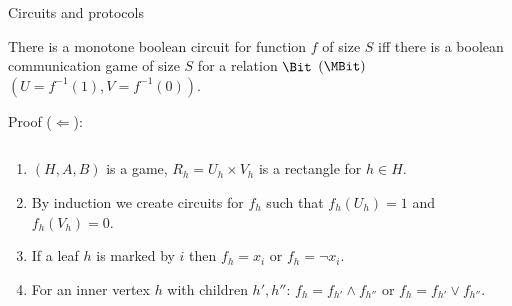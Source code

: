 \begin{frame}{Circuits and protocols}

    \begin{theorem}
        There is a {\color{blue}monotone} boolean circuit for function $f$ of size $S$ iff there is a
        boolean communication game of size $S$ for a relation $\Bit$ {\color{blue}$(\MBit)$} $(U =
        f^{-1}(1), V = f^{-1}(0))$.
    \end{theorem}
    
    \pause
    Proof ($\Leftarrow$):
    \begin{columns}[t]
		\begin{column}{0.65\textwidth}
            \vspace{-5mm}
            \begin{enumerate}
                \item<3-> $(H, A, B)$ is a game, $R_h = U_h \times V_h$ is a rectangle for $h \in H$.
                \item<4-> By induction we create circuits for $f_h$ such that $f_h(U_h) = 1$ and
                    $f_h(V_h) = 0$.
                \item<5-> If a leaf $h$ is marked by $i$ then $f_h = x_i$ or $f_h = \neg x_i$.
                \item<6-> For an inner vertex $h$ with children $h', h''$: $f_h = f_{h'} \land f_{h''}$
                    or $f_h = f_{h'} \lor f_{h''}$.
            \end{enumerate}
        \end{column}
        
		\begin{column}{0.35\textwidth}
		\end{column}
	\end{columns}
\end{frame}

